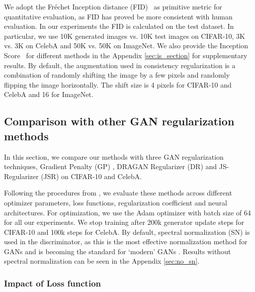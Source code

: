 \documentclass{article} \usepackage{iclr2020_conference,times}
\begin{document}
We adopt the Fr\'echet Inception distance (FID)~\citep{FID} as primitive metric for quantitative evaluation, 
as FID has proved be more consistent with human evaluation. 
In our experiments the FID is calculated on the test dataset.
In particular, we use 10K generated images vs. 10K test images on CIFAR-10, 3K vs. 3K on CelebA and 50K vs. 50K on ImageNet. We also provide the Inception Score~\citep{salimans2016improved} for different methods in the Appendix \ref{sec:is_section} for supplementary results. 
By default, the augmentation used in consistency regularization is a combination of randomly 
shifting the image by a few pixels and randomly flipping the image horizontally.
The shift size is 4 pixels for CIFAR-10 and CelebA and 16 for ImageNet.

\subsection{Comparison with other GAN regularization methods}
In this section, we compare our methods with three GAN regularization techniques,  Gradient Penalty (GP) \citep{WGANGP}, DRAGAN Regularizer (DR) \citep{kodali2017convergence} and JS-Regularizer (JSR) \citep{RothLNH17} on CIFAR-10 and CelebA. 

Following the procedures from \citep{compare_gan, LucicKMGB18}, we evaluate these methods across different optimizer parameters, loss functions, regularization coefficient and neural architectures.
For optimization, we use the Adam optimizer with batch size of 64 for all our experiments.
We stop training after 200k generator update steps for CIFAR-10 and 100k steps for CelebA. By default, spectral normalization (SN) \citep{Miyato18a} is used in the discriminator, 
as this is the most effective normalization method for GANs \citep{compare_gan} and is becoming the standard for `modern' GANs \citep{SAGAN,BIGGAN}.
Results without spectral normalization can be seen in the Appendix \ref{sec:no_sn}.


\subsubsection{Impact of Loss function} \label{sec: impact_loss}
\end{document}
